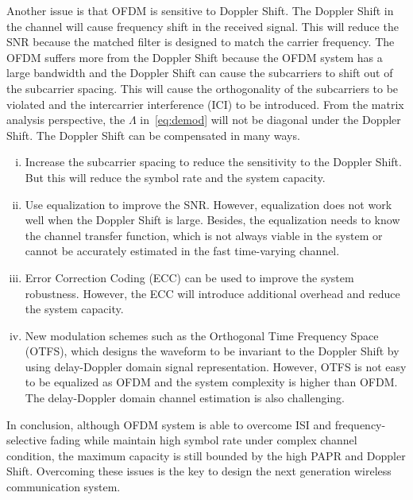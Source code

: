 Another issue is that OFDM is sensitive to Doppler Shift. The Doppler Shift in the channel will cause frequency shift in the received signal. This will reduce the SNR because the matched filter is designed to match the carrier frequency. The OFDM suffers more from the Doppler Shift because the OFDM system has a large bandwidth and the Doppler Shift can cause the subcarriers to shift out of the subcarrier spacing. This will cause the orthogonality of the subcarriers to be violated and the intercarrier interference (ICI) to be introduced. From the matrix analysis perspective, the $\Lambda$ in~\cref{eq:demod} will not be diagonal under the Doppler Shift. The Doppler Shift can be compensated in many ways.
\begin{enumerate}[(i)]
    \item Increase the subcarrier spacing to reduce the sensitivity to the Doppler Shift. But this will reduce the symbol rate and the system capacity.
    \item Use equalization to improve the SNR. However, equalization does not work well when the Doppler Shift is large. Besides, the equalization needs to know the channel transfer function, which is not always viable in the system or cannot be accurately estimated in the fast time-varying channel.
    \item Error Correction Coding (ECC) can be used to improve the system robustness. However, the ECC will introduce additional overhead and reduce the system capacity.
    \item New modulation schemes such as the Orthogonal Time Frequency Space (OTFS), which designs the waveform to be invariant to the Doppler Shift by using delay-Doppler domain signal representation. However, OTFS is not easy to be equalized as OFDM and the system complexity is higher than OFDM. The delay-Doppler domain channel estimation is also challenging.
\end{enumerate}

In conclusion, although OFDM system is able to overcome ISI and frequency-selective fading while maintain high symbol rate under complex channel condition, the maximum capacity is still bounded by the high PAPR and Doppler Shift. Overcoming these issues is the key to design the next generation wireless communication system.

